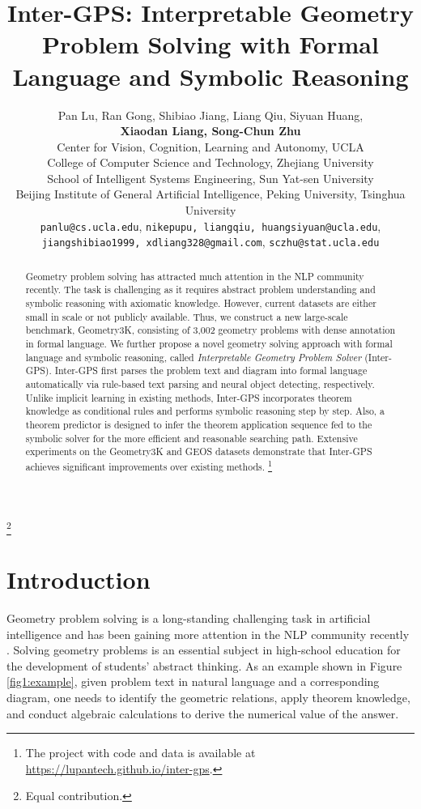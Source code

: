 \documentclass[11pt,a4paper]{article}
\title{Inter-GPS: Interpretable Geometry Problem Solving with Formal Language and Symbolic Reasoning}
\author{Pan Lu, Ran Gong, Shibiao Jiang, Liang Qiu, Siyuan Huang, \\ \textbf{Xiaodan Liang, Song-Chun Zhu}\\
  Center for Vision, Cognition, Learning and Autonomy, UCLA \\
  College of Computer Science and Technology, Zhejiang University \\
  School of Intelligent Systems Engineering, Sun Yat-sen University\\
  Beijing Institute of General Artificial Intelligence, Peking University, Tsinghua University\\
  \texttt{panlu@cs.ucla.edu},
  \texttt{\text{\{}nikepupu, liangqiu, huangsiyuan\text{\}}@ucla.edu}, \\
  \texttt{\text{\{}jiangshibiao1999, xdliang328\text{\}}@gmail.com}, 
  \texttt{sczhu@stat.ucla.edu}
  }
\date{}
\newcommand\blfootnote[1]{\begingroup
  \renewcommand\thefootnote{}\footnote{#1}\addtocounter{footnote}{-1}\endgroup
}
\begin{document}
\maketitle

\blfootnote{Equal contribution.}

\begin{abstract}
Geometry problem solving has attracted much attention in the NLP community recently. The task is challenging as it requires abstract problem understanding and symbolic reasoning with axiomatic knowledge. However, current datasets are either small in scale or not publicly available. Thus, we construct a new large-scale benchmark, Geometry3K, consisting of 3,002 geometry problems with dense annotation in formal language. We further propose a novel geometry solving approach with formal language and symbolic reasoning, called \textit{Interpretable Geometry Problem Solver} (Inter-GPS). Inter-GPS first parses the problem text and diagram into formal language automatically via rule-based text parsing and neural object detecting, respectively. Unlike implicit learning in existing methods, Inter-GPS incorporates theorem knowledge as conditional rules and performs symbolic reasoning step by step. Also, a theorem predictor is designed to infer the theorem application sequence fed to the symbolic solver for the more efficient and reasonable searching path. Extensive experiments on the Geometry3K and GEOS datasets demonstrate that Inter-GPS achieves significant improvements over existing methods.
\footnote{The project with code and data is available at \url{https://lupantech.github.io/inter-gps}.}




\end{abstract}



\section{Introduction}

Geometry problem solving is a long-standing challenging task in artificial intelligence and has been gaining more attention in the NLP community recently \cite{seo2014diagram,hopkins2019semeval,sachan2020discourse}. Solving geometry problems is an essential subject in high-school education for the development of students' abstract thinking. As an example shown in Figure \ref{fig1:example}, given problem text in natural language and a corresponding diagram, one needs to identify the geometric relations, apply theorem knowledge, and conduct algebraic calculations to derive the numerical value of the answer.
\end{document}
